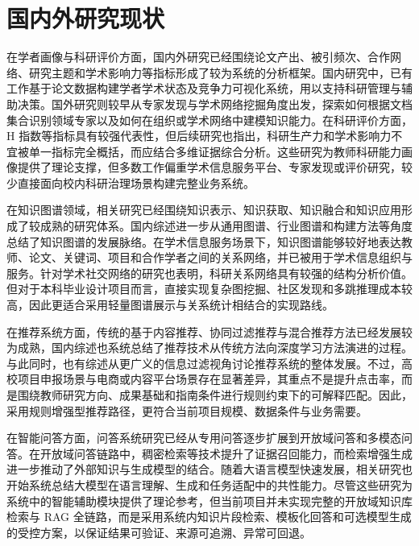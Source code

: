 \documentclass[12pt,a4paper]{ctexbook}
\begin{document}
\section{国内外研究现状}
在学者画像与科研评价方面，国内外研究已经围绕论文产出、被引频次、合作网络、研究主题和学术影响力等指标形成了较为系统的分析框架。国内研究中，已有工作基于论文数据构建学者学术状态及竞争力可视化系统，用以支持科研管理与辅助决策\cite{scholar_visualization_2020}。国外研究则较早从专家发现与学术网络挖掘角度出发，探索如何根据文档集合识别领域专家以及如何在组织或学术网络中建模知识能力\cite{expert_finding_models_2006}\cite{expert_finding_systems_2019}。在科研评价方面，H 指数等指标具有较强代表性\cite{h_index_2005}，但后续研究也指出，科研生产力和学术影响力不宜被单一指标完全概括，而应结合多维证据综合分析\cite{research_productivity_2011}\cite{scientific_impact_2020}。这些研究为教师科研能力画像提供了理论支撑，但多数工作偏重学术信息服务平台、专家发现或评价研究，较少直接面向校内科研治理场景构建完整业务系统。

在知识图谱领域，相关研究已经围绕知识表示、知识获取、知识融合和知识应用形成了较成熟的研究体系\cite{kg_survey_foreign_2021}。国内综述进一步从通用图谱、行业图谱和构建方法等角度总结了知识图谱的发展脉络\cite{kg_general_survey}\cite{kg_construction_2022}。在学术信息服务场景下，知识图谱能够较好地表达教师、论文、关键词、项目和合作学者之间的关系网络，并已被用于学术信息组织与服务\cite{academic_kg_service_2018}。针对学术社交网络的研究也表明，科研关系网络具有较强的结构分析价值\cite{arnetminer_2008}。但对于本科毕业设计项目而言，直接实现复杂图挖掘、社区发现和多跳推理成本较高，因此更适合采用轻量图谱展示与关系统计相结合的实现路线。

在推荐系统方面，传统的基于内容推荐、协同过滤推荐与混合推荐方法已经发展较为成熟\cite{next_gen_recsys_2007}，国内综述也系统总结了推荐技术从传统方法向深度学习方法演进的过程\cite{recsys_survey_cn_2022}。与此同时，也有综述从更广义的信息过滤视角讨论推荐系统的整体发展\cite{recommender_systems_2012}。不过，高校项目申报场景与电商或内容平台场景存在显著差异，其重点不是提升点击率，而是围绕教师研究方向、成果基础和指南条件进行规则约束下的可解释匹配。因此，采用规则增强型推荐路径，更符合当前项目规模、数据条件与业务需要。

在智能问答方面，问答系统研究已经从专用问答逐步扩展到开放域问答和多模态问答\cite{qa_system_survey_2023}。在开放域问答链路中，稠密检索等技术提升了证据召回能力\cite{dpr_2020}，而检索增强生成进一步推动了外部知识与生成模型的结合\cite{rag_2021}。随着大语言模型快速发展，相关研究也开始系统总结大模型在语言理解、生成和任务适配中的共性能力\cite{llm_survey_2023}。尽管这些研究为系统中的智能辅助模块提供了理论参考，但当前项目并未实现完整的开放域知识库检索与 RAG 全链路，而是采用系统内知识片段检索、模板化回答和可选模型生成的受控方案，以保证结果可验证、来源可追溯、异常可回退。
\end{document}
